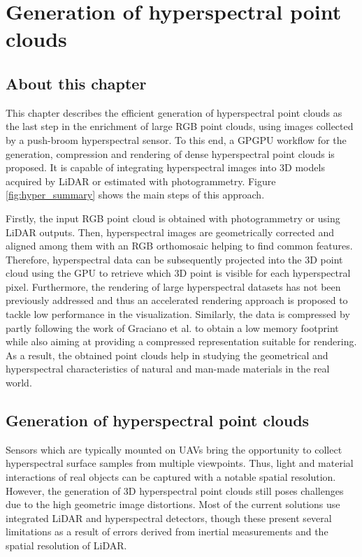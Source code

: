 \setchapterpreamble[u]{\margintoc}
\chapter{Generation of hyperspectral point clouds}
\label{sec:hyperspectral_point_clouds}

\section*{About this chapter}

This chapter describes the efficient generation of hyperspectral point clouds as the last step in the enrichment of large RGB point clouds, using images collected by a push-broom hyperspectral sensor. To this end, a GPGPU workflow for the generation, compression and rendering of dense hyperspectral point clouds is proposed. It is capable of integrating hyperspectral images into 3D models acquired by LiDAR or estimated with photogrammetry. Figure \ref{fig:hyper_summary} shows the main steps of this approach.

Firstly, the input RGB point cloud is obtained with photogrammetry or using LiDAR outputs. Then, hyperspectral images are geometrically corrected and aligned among them with an RGB orthomosaic helping to find common features. Therefore, hyperspectral data can be subsequently projected into the 3D point cloud using the GPU to retrieve which 3D point is visible for each hyperspectral pixel. Furthermore, the rendering of large hyperspectral datasets has not been previously addressed and thus an accelerated rendering approach is proposed to tackle low performance in the visualization. Similarly, the data is compressed by partly following the work of Graciano et al. \cite{graciano_quadstack_2021} to obtain a low memory footprint while also aiming at providing a compressed representation suitable for rendering. As a result, the obtained point clouds help in studying the geometrical and hyperspectral characteristics of natural and man-made materials in the real world.

\section{Generation of hyperspectral point clouds}

Sensors which are typically mounted on UAVs bring the opportunity to collect hyperspectral surface samples from multiple viewpoints. Thus, light and material interactions of real objects can be captured with a notable spatial resolution. However, the generation of 3D hyperspectral point clouds still poses challenges due to the high geometric image distortions. Most of the current solutions use integrated LiDAR and hyperspectral detectors, though these present several limitations as a result of errors derived from inertial measurements and the spatial resolution of LiDAR. 

